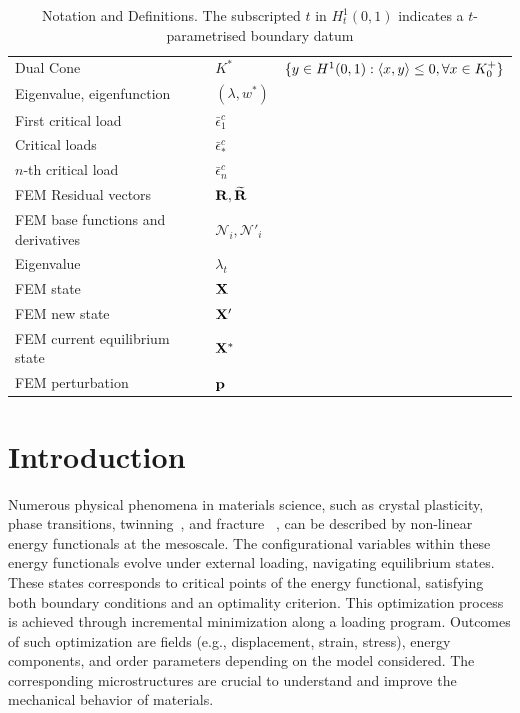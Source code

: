 \documentclass[10pt]{article}
\begin{document}
\begin{table}[h!]
\begin{tabular}{  m{5.5cm}  m{3cm}  m{6cm}  }
    Dual Cone& $K^*$ & $\{y \in H^1(0,1): \langle x,y \rangle \leq 0, \forall x \in K^+_{0}\}$\\
    Eigenvalue, eigenfunction& $(\lambda, w^*)$ & \\
    First critical load & $\bar \epsilon^c_1$ & \\
    Critical loads & $\bar \epsilon^c_*$ & \\
    $n$-th critical load & $\bar \epsilon^c_n$ & \\
    FEM Residual vectors& ${\bf R}, \widetilde{\bf R}$ & \\
    FEM base functions and derivatives  & ${\mathcal N}_i, {\mathcal N}'_i$ & \\
   Eigenvalue & $\lambda_t$ & \\
   FEM state & $\mathbf{X}$ & \\
   FEM new state & $\mathbf{X}'$ & \\
   FEM current equilibrium state & $\mathbf{X^*}$ & \\
   FEM perturbation & $\mathbf{p}$ & \\
  \end{tabular}
  \caption{Notation and Definitions. The subscripted $t$ in $H_t^1(0, 1)$ indicates a $t$-parametrised boundary datum}
\label{table:notation}
\end{table}

\section{Introduction}
Numerous physical phenomena in materials science, such as crystal plasticity, phase transitions, twinning~\cite{Clayton2011-xq}, and fracture ~\cite{francfort_marigo1998,Baldelli2014-ho,Baldelli2021-gc}, can be described by non-linear energy functionals at the mesoscale. 
%
%
%
The configurational variables within these energy functionals evolve under external loading, navigating equilibrium states. These states corresponds to critical points of the energy functional, satisfying both boundary conditions and an optimality criterion.
This optimization process is achieved through incremental minimization along a loading program. Outcomes of such optimization are fields
(e.g., displacement, strain, stress), energy components, and order parameters depending on the model considered. The corresponding microstructures are crucial to understand and improve the mechanical behavior of materials.
\end{document}
